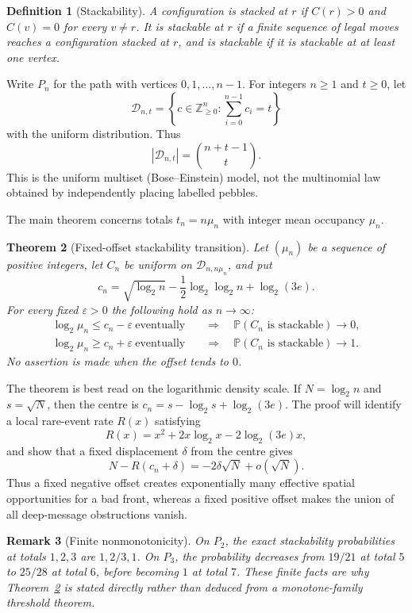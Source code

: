 \documentclass[11pt]{article}
\newtheorem{theorem}{Theorem}[section]
\newtheorem{remark}[theorem]{Remark}
\newtheorem{definition}[theorem]{Definition}
\newcommand{\Prob}{\mathbb P}
\newcommand{\Z}{\mathbb Z}
\newcommand{\eps}{\varepsilon}
\begin{document}
\begin{definition}[Stackability]
A configuration is \emph{stacked at $r$} if $C(r)>0$ and $C(v)=0$ for every
$v\ne r$.  It is \emph{stackable at $r$} if a finite sequence of legal moves
reaches a configuration stacked at $r$, and is \emph{stackable} if it is
stackable at at least one vertex.
\end{definition}

Write $P_n$ for the path with vertices $0,1,\dots,n-1$.  For integers $n\ge1$
and $t\ge0$, let
\[
 \mathcal D_{n,t}
 =\left\{c\in\Z_{\ge0}^n:\sum_{i=0}^{n-1}c_i=t\right\}
\]
with the uniform distribution.  Thus
\[
 |\mathcal D_{n,t}|=\binom{n+t-1}{t}.
\]
This is the uniform multiset (Bose--Einstein) model, not the multinomial law
obtained by independently placing labelled pebbles.

The main theorem concerns totals $t_n=n\mu_n$ with integer mean occupancy
$\mu_n$.

\begin{theorem}[Fixed-offset stackability transition]\label{thm:main}
Let $(\mu_n)$ be a sequence of positive integers, let $C_n$ be uniform on
$\mathcal D_{n,n\mu_n}$, and put
\[
 c_n=\sqrt{\log_2 n}-\frac12\log_2\log_2 n+\log_2(3e).
\]
For every fixed $\eps>0$ the following hold as $n\to\infty$:
\begin{align*}
 \log_2\mu_n\le c_n-\eps\ \text{eventually}
 &\quad\Longrightarrow\quad
 \Prob(C_n\text{ is stackable})\longrightarrow0,\\
 \log_2\mu_n\ge c_n+\eps\ \text{eventually}
 &\quad\Longrightarrow\quad
 \Prob(C_n\text{ is stackable})\longrightarrow1.
\end{align*}
No assertion is made when the offset tends to $0$.
\end{theorem}

The theorem is best read on the logarithmic density scale.  If
$N=\log_2 n$ and $s=\sqrt N$, then the centre is
$c_n=s-\log_2s+\log_2(3e)$.  The proof will identify a local rare-event rate
$R(x)$ satisfying
\[
 R(x)=x^2+2x\log_2x-2\log_2(3e)x,
 \tag{2.1}\label{eq:R}
\]
and show that a fixed displacement $\delta$ from the centre gives
\[
 N-R(c_n+\delta)=-2\delta\sqrt N+o(\sqrt N).
 \tag{2.2}\label{eq:balance-preview}
\]
Thus a fixed negative offset creates exponentially many effective spatial
opportunities for a bad front, whereas a fixed positive offset makes the
union of all deep-message obstructions vanish.

\begin{remark}[Finite nonmonotonicity]
On $P_2$, the exact stackability probabilities at totals $1,2,3$ are
$1,2/3,1$.  On $P_3$, the probability decreases from $19/21$ at total $5$ to
$25/28$ at total $6$, before becoming $1$ at total $7$.  These finite facts
are why Theorem~\ref{thm:main} is stated directly rather than deduced from a
monotone-family threshold theorem.
\end{remark}
\end{document}
